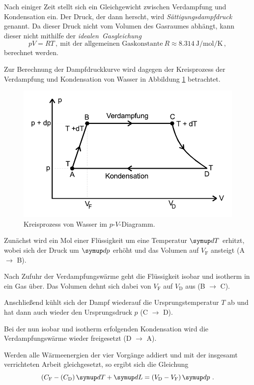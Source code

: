 Nach einiger Zeit stellt sich ein Gleichgewicht zwischen Verdampfung und Kondensation ein. 
Der Druck, der dann herscht, wird \textit{Sättigungsdampfdruck} genannt.
Da dieser Druck nicht vom Volumen des Gasraumes abhängt, kann dieser nicht mithilfe der
\textit{idealen~Gasgleichung} 
\begin{equation}
    pV = RT \, , \: \text{mit der allgemeinen Gaskonstante} \: R \approx \qty{8.314}{\joule\per\mol\per\kelvin} \, ,
    \label{eq:idgasgleichung} 
\end{equation}
berechnet werden.

Zur Berechnung der Dampfdruckkurve wird dagegen der Kreisprozess der Verdampfung und Kondensation von Wasser
in Abbildung \ref{fig:kreisprozess} betrachtet.
\begin{figure} 
    \centering
    \includegraphics[width=12cm] {pictures/kreisprozess.pdf}  
    \caption{Kreisprozess von Wasser im $p$-$V$-Diagramm. \cite[3]{v203}}
    \label{fig:kreisprozess}
\end{figure}

Zunächst wird ein Mol einer Flüssigkeit um eine Temperatur $\dif{T}$ erhitzt, 
wobei sich der Druck um $\dif{p}$ erhöht und das Volumen auf $V_{\text{F}}$ ansteigt (A $\to$ B). 

Nach Zufuhr der Verdampfungswärme geht die Flüssigkeit isobar und isotherm in ein Gas über.
Das Volumen dehnt sich dabei von $V_{\text{F}}$ auf $V_{\text{D}}$ aus (B $\to$ C). 

Anschließend kühlt sich der Dampf wiederauf die Ursprungstemperatur $T$ ab 
und hat dann auch wieder den Ursprungsdruck $p$ (C $\to$ D).

Bei der nun isobar und isotherm erfolgenden Kondensation wird die Verdampfungswärme wieder freigesetzt (D $\to$ A).

Werden alle Wärmeenergien der vier Vorgänge addiert und mit der insgesamt verrichteten Arbeit gleichgesetzt,
so ergibt sich die Gleichung
\begin{equation}
    (C_\text{F} - (C_\text{D}) \dif{T} + \dif{L} = (V_\text{D} - V_\text{F}) \dif{p} \, .
\end{equation}


